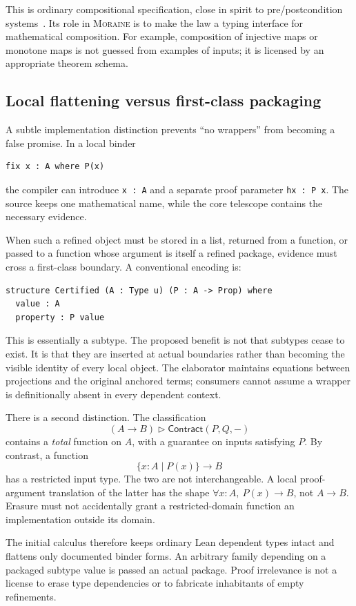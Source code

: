 \documentclass[11pt,letterpaper]{article}
\newcommand{\code}[1]{\nolinkurl{#1}}
\newcommand{\view}[2]{#1\mathbin{\triangleright}#2}
\newcommand{\Contract}{\mathsf{Contract}}
\newcommand{\moraine}{\textsc{Moraine}}
\theoremstyle{definition}
\theoremstyle{remark}
\begin{document}
This is ordinary compositional specification, close in spirit to
pre/postcondition systems~\cite{FStar}. Its role in \moraine{} is to make the law a
typing interface for mathematical composition. For example, composition of
injective maps or monotone maps is not guessed from examples of inputs; it is
licensed by an appropriate theorem schema.

\subsection{Local flattening versus first-class packaging}\label{sec:pack}
A subtle implementation distinction prevents ``no wrappers'' from becoming a
false promise. In a local binder
\begin{lstlisting}
fix x : A where P(x)
\end{lstlisting}
the compiler can introduce \code{x : A} and a separate proof parameter
\code{hx : P x}. The source keeps one mathematical name, while the core telescope
contains the necessary evidence.

When such a refined object must be stored in a list, returned from a function,
or passed to a function whose argument is itself a refined package, evidence
must cross a first-class boundary. A conventional encoding is:
\begin{lstlisting}
structure Certified (A : Type u) (P : A -> Prop) where
  value : A
  property : P value
\end{lstlisting}
This is essentially a subtype. The proposed benefit is not that subtypes cease
to exist. It is that they are inserted at actual boundaries rather than becoming
the visible identity of every local object. The elaborator maintains equations
between projections and the original anchored terms; consumers cannot assume a
wrapper is definitionally absent in every dependent context.

There is a second distinction. The classification
\[
\view{(A\to B)}{\Contract(P,Q,-)}
\]
contains a \emph{total} function on $A$, with a guarantee on inputs satisfying
$P$. By contrast, a function
\[
\{x:A\mid P(x)\}\to B
\]
has a restricted input type. The two are not interchangeable. A local
proof-argument translation of the latter has the shape
$\forall x:A,\ P(x)\to B$, not $A\to B$. Erasure must not accidentally grant a
restricted-domain function an implementation outside its domain.

The initial calculus therefore keeps ordinary Lean dependent types intact and
flattens only documented binder forms. An arbitrary family depending on a
packaged subtype value is passed an actual package. Proof irrelevance is not a
license to erase type dependencies or to fabricate inhabitants of empty
refinements.
\end{document}

